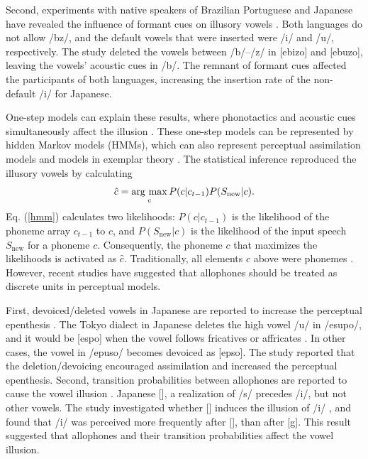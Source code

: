 \documentclass[a4paper,11pt,twocolumn]{article}
\newcommand{\argmax}{\mathop{\rm arg~max}\limits}
\begin{document}
Second, experiments with native speakers of Brazilian Portuguese and Japanese have revealed the influence of formant cues on illusory vowels \cite{dupoux2011illusory}. Both languages do not allow /bz/, and the default vowels that were inserted were /i/ and /u/, respectively. The study deleted the vowels between /b/--/z/ in [ebizo] and [ebuzo], leaving the vowels' acoustic cues in /b/. The remnant of formant cues affected the participants of both languages, increasing the insertion rate of the non-default /i/ for Japanese.

One-step models can explain these results, where phonotactics and acoustic cues simultaneously affect the illusion \cite{dupoux2011illusory}. These one-step models can be represented by hidden Markov models (HMMs), which can also represent perceptual assimilation models \cite{best2001discrimination} and models in exemplar theory \cite{lacerda1995perceptual}. The statistical inference \cite{feldman2009influence, wilson2013bayesian} reproduced the illusory vowels \cite{kishiyama2021influence} by calculating
\begin{equation} \label{hmm}
    \hat{c} = \argmax_{c} P(c | c_{t-1})P(S_{\text{new}}|c).
\end{equation}
Eq. (\ref{hmm}) calculates two likelihoods: $P(c|c_{t-1})$ is the likelihood of the phoneme array $c_{t-1}$ to $c$, and $P(S_{\text{new}}|c)$ is the likelihood of the input speech $S_{\text{new}}$ for a phoneme $c$. Consequently, the phoneme $c$ that maximizes the likelihoods is activated as $\hat{c}$.
Traditionally, all elements $c$ above were phonemes \cite{wilson2013bayesian}. However, recent studies have suggested that allophones should be treated as discrete units in perceptual models.

First, devoiced/deleted vowels in Japanese are reported to increase the perceptual epenthesis \cite{kilpatrick2018japanese}. The Tokyo dialect in Japanese deletes the high vowel /u/ in /esupo/, and it would be [espo] when the vowel follows fricatives or affricates \cite{fujimoto2003devoice_eng, shaw2018lingual}. In other cases, the vowel in /epuso/ becomes devoiced as [ep\textsubring{\textturnm}so]. The study reported that the deletion/devoicing encouraged assimilation and increased the perceptual epenthesis. Second, transition probabilities between allophones are reported to cause the vowel illusion \cite{kilpatrick2020japanese}. Japanese [\textctc], a realization of /s/ precedes /i/, but not other vowels. The study investigated whether [\textctc{}] induces the illusion of /i/ \cite{kilpatrick2020japanese}, and found that /i/ was perceived more frequently after [\textctc], than after [g]. This result suggested that allophones and their transition probabilities affect the vowel illusion.
\end{document}
